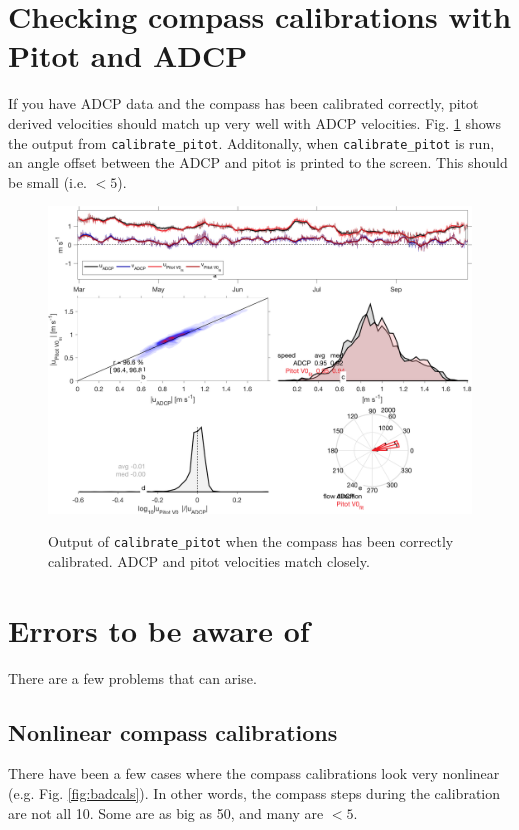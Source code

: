\clearpage
\section{Checking compass calibrations with Pitot and ADCP}

If you have ADCP data and the compass has been calibrated correctly, pitot derived velocities should match up very well with ADCP velocities. Fig. \ref{fig:pitotADCP} shows the output from \texttt{calibrate\_pitot}. Additonally, when \texttt{calibrate\_pitot} is run, an angle offset between the ADCP and pitot is printed to the screen. This should be small (i.e. $<5$\degree).

\begin{figure}[h]
  \centering \centering\noindent\includegraphics[width=14cm,angle=0]{./figs/Pitot_vs_ADCP_resized.png}\\
    \caption{Output of \texttt{calibrate\_pitot} when the compass has been correctly calibrated. ADCP and pitot velocities match closely.}\label{fig:pitotADCP}
\end{figure}

\section{Errors to be aware of}

There are a few problems that can arise.

\subsection{Nonlinear compass calibrations}
There have been a few cases where the compass calibrations look very nonlinear (e.g. Fig. \ref{fig:badcals}). In other words, the compass steps during the calibration are not all 10\degree. Some are as big as 50\degree, and many are $<5$\degree.

